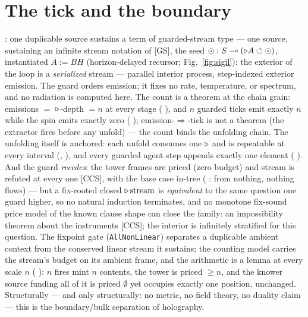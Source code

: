 \documentclass[11pt]{article}
\begin{document}
\section{The tick and the boundary}

 \meas{}: one duplicable source sustains a
term of guarded-stream type --- one source, sustaining an infinite stream
notation of [GS], the seed
$\odot : \mathit{S} \multimap (\triangleright A \circlearrowleft \odot)$, instantiated $A := BH$
(horizon-delayed recursor; Fig.~\ref{fig:sigil}): the exterior of the loop
is a \emph{serialized} stream --- parallel interior process, step-indexed
exterior emission. The guard orders emission; it fixes no rate, temperature,
or spectrum, and no radiation is computed here. \interp{} The count is a theorem at the chain grain: emissions $=$
$\triangleright$-depth $=n$ at every stage ( \meas{}),
and $n$ guarded ticks emit exactly $n$ while the spin emits exactly zero
( \meas{}); emission-$\Rightarrow$-tick is not a
theorem (the extractor fires before any unfold) --- the count binds the
unfolding chain. The unfolding itself is anchored: each unfold consumes one
$\triangleright$ and is repeatable at every interval
(,  \meas{}), and every
guarded agent step appends exactly one element
( \meas{}). And the guard \emph{recedes}: the tower frames are priced
(zero budget) and stream is refuted at every one [CCS], with the base case
in-tree ( \meas{}: from nothing, nothing flows) ---
but a fix-rooted closed $\triangleright\,\mathrm{stream}$ is \emph{equivalent} to
the same question one guard higher, so no natural induction terminates, and
no monotone fix-sound price model of the known clause shape can close the
family: an impossibility theorem about the instruments [CCS]; the interior
is infinitely stratified for this question. \interp{} The fixpoint gate
(\texttt{AllNonLinear}) separates a duplicable ambient context from the
conserved linear stream it sustains; the counting model carries the stream's
budget on its ambient frame, and the arithmetic is a lemma at every scale $n$
( \meas{}): $n$ fires mint $n$ contents, the tower is
priced ${\ge}n$, and the knower source funding all of it is priced
$\emptyset$ yet occupies exactly one position, unchanged. Structurally --- and only
structurally: no metric, no field theory, no duality claim --- this is the
boundary/bulk separation of holography. \interp{}
\end{document}
